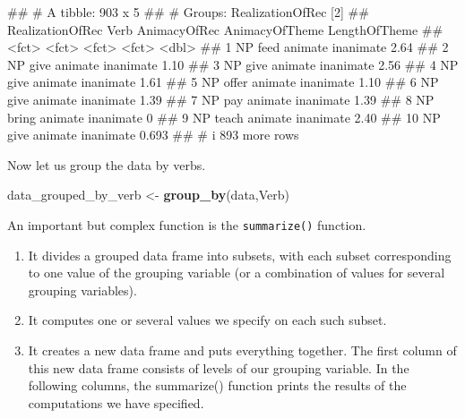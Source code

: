 \documentclass[
]{book}
\newenvironment{Shaded}{\begin{snugshade}}{\end{snugshade}}
\newcommand{\FunctionTok}[1]{\textcolor[rgb]{0.13,0.29,0.53}{\textbf{#1}}}
\newcommand{\NormalTok}[1]{#1}
\newcommand{\OtherTok}[1]{\textcolor[rgb]{0.56,0.35,0.01}{#1}}
\providecommand{\tightlist}{%
  \setlength{\itemsep}{0pt}\setlength{\parskip}{0pt}}
\begin{document}
\begin{Shaded}
\begin{Highlighting}[]
\NormalTok{\#\# \# A tibble: 903 x 5}
\NormalTok{\#\# \# Groups:   RealizationOfRec [2]}
\NormalTok{\#\#    RealizationOfRec Verb  AnimacyOfRec AnimacyOfTheme LengthOfTheme}
\NormalTok{\#\#    \textless{}fct\textgreater{}            \textless{}fct\textgreater{} \textless{}fct\textgreater{}        \textless{}fct\textgreater{}                  \textless{}dbl\textgreater{}}
\NormalTok{\#\#  1 NP               feed  animate      inanimate              2.64 }
\NormalTok{\#\#  2 NP               give  animate      inanimate              1.10 }
\NormalTok{\#\#  3 NP               give  animate      inanimate              2.56 }
\NormalTok{\#\#  4 NP               give  animate      inanimate              1.61 }
\NormalTok{\#\#  5 NP               offer animate      inanimate              1.10 }
\NormalTok{\#\#  6 NP               give  animate      inanimate              1.39 }
\NormalTok{\#\#  7 NP               pay   animate      inanimate              1.39 }
\NormalTok{\#\#  8 NP               bring animate      inanimate              0    }
\NormalTok{\#\#  9 NP               teach animate      inanimate              2.40 }
\NormalTok{\#\# 10 NP               give  animate      inanimate              0.693}
\NormalTok{\#\# \# i 893 more rows}
\end{Highlighting}
\end{Shaded}

Now let us group the data by verbs.

\begin{Shaded}
\begin{Highlighting}[]
\NormalTok{data\_grouped\_by\_verb }\OtherTok{\textless{}{-}} \FunctionTok{group\_by}\NormalTok{(data,Verb)}
\end{Highlighting}
\end{Shaded}

An important but complex function is the \texttt{summarize()} function.

\begin{enumerate}
\def\labelenumi{\arabic{enumi}.}
\tightlist
\item
  It divides a grouped data frame into subsets, with each subset corresponding to one value of the grouping variable (or a combination of values for several grouping variables).
\item
  It computes one or several values we specify on each such subset.
\item
  It creates a new data frame and puts everything together. The first column of this new data frame consists of levels of our grouping variable. In the following columns, the summarize() function prints the results of the computations we have specified.
\end{enumerate}
\end{document}
